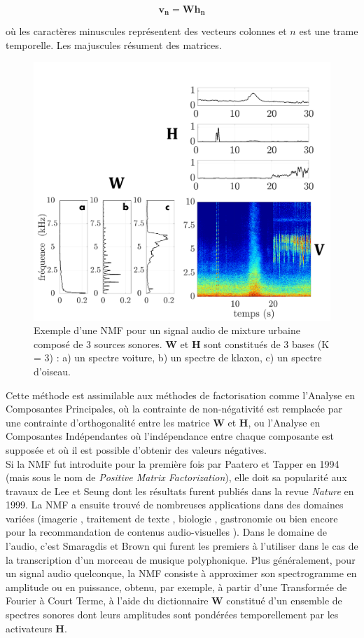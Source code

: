 \begin{equation}\label{eq:nmf_h}
\mathbf{v_n} = \mathbf{Wh_n}
\end{equation}

où les caractères minuscules représentent des vecteurs colonnes et $n$ est une trame temporelle. Les majuscules résument des matrices. 

\begin{figure}[t]
\centering
\includegraphics[width=.5\textwidth]{./figures/NMF/schema_introduction_nmf_fr.pdf}
\caption{Exemple d'une NMF pour un signal audio de mixture urbaine composé de 3 sources sonores. $\mathbf{W}$ et $\mathbf{H}$ sont constitués de 3 bases (K = 3) : a) un spectre voiture, b) un spectre de klaxon, c) un spectre d'oiseau.}
\label{fig:ex_NMF}
\end{figure}


Cette méthode est assimilable aux méthodes de factorisation comme l'Analyse en Composantes Principales, où la contrainte de non-négativité est remplacée par une contrainte d'orthogonalité entre les matrice $\mathbf{W}$ et $\mathbf{H}$, ou l'Analyse en Composantes Indépendantes où l'indépendance entre chaque composante est supposée et où il est possible d'obtenir des valeurs négatives. \\


Si la NMF fut introduite pour la première fois par Paatero et Tapper \cite{paatero_positive_1994} en 1994 (mais sous le nom de \textit{Positive Matrix Factorization}), elle doit sa popularité aux travaux de Lee et Seung \cite{lee_learning_1999} dont les résultats furent publiés dans la revue \textit{Nature} en 1999. La NMF a ensuite trouvé de nombreuses applications dans des domaines variées 
(imagerie \cite{guillamet_introducing_2003, monga_robust_2007}, traitement de texte \cite{xu_document_2003, berry_email_2005}, biologie \cite{gao_improving_2005, chen_constrained_nodate}, gastronomie \cite{hawkins_clustering_2006} ou bien encore pour la recommandation de contenus audio-visuelles \cite{luo2014efficient}). Dans le domaine de l'audio, c'est Smaragdis et Brown \cite{smaragdis_non-negative_2003} qui furent les premiers à l'utiliser dans le cas de la transcription d'un morceau de musique polyphonique. Plus généralement, pour un signal audio quelconque, la NMF consiste à approximer son spectrogramme en amplitude ou en puissance, obtenu, par exemple, à partir d'une Transformée de Fourier à Court Terme, à l'aide du dictionnaire $\textbf{W}$ constitué d'un ensemble de spectres sonores dont leurs amplitudes sont pondérées temporellement par les activateurs $\textbf{H}$. 

